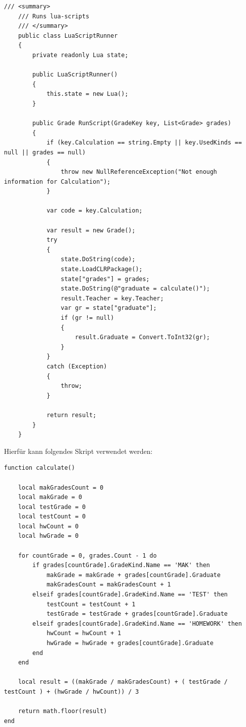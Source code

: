 \begin{lstlisting}[language={[Sharp]C},caption=Code for NLua,label=lst:impl:nlua]
    /// <summary>
    /// Runs lua-scripts
    /// </summary>
    public class LuaScriptRunner
    {
        private readonly Lua state;

        public LuaScriptRunner()
        {
            this.state = new Lua();
        }

        public Grade RunScript(GradeKey key, List<Grade> grades)
        {
            if (key.Calculation == string.Empty || key.UsedKinds == null || grades == null)
            {
                throw new NullReferenceException("Not enough information for Calculation");
            }

            var code = key.Calculation;

            var result = new Grade();
            try
            {
                state.DoString(code);
                state.LoadCLRPackage();
                state["grades"] = grades;
                state.DoString(@"graduate = calculate()");
                result.Teacher = key.Teacher;
                var gr = state["graduate"];
                if (gr != null) 
                {
                    result.Graduate = Convert.ToInt32(gr);
                }
            }
            catch (Exception)
            {
                throw;
            }

            return result;
        }
    }
\end{lstlisting}
\newpage
Hierfür kann folgendes Skript verwendet werden:
\begin{lstlisting}[language={[5.0]Lua},caption=Lua Example,label=lst:impl:luascript]
function calculate()

    local makGradesCount = 0
    local makGrade = 0
    local testGrade = 0
    local testCount = 0
    local hwCount = 0
    local hwGrade = 0

    for countGrade = 0, grades.Count - 1 do 
        if grades[countGrade].GradeKind.Name == 'MAK' then
            makGrade = makGrade + grades[countGrade].Graduate
            makGradesCount = makGradesCount + 1
        elseif grades[countGrade].GradeKind.Name == 'TEST' then
            testCount = testCount + 1
            testGrade = testGrade + grades[countGrade].Graduate
        elseif grades[countGrade].GradeKind.Name == 'HOMEWORK' then
            hwCount = hwCount + 1
            hwGrade = hwGrade + grades[countGrade].Graduate
        end
    end

    local result = ((makGrade / makGradesCount) + ( testGrade / testCount ) + (hwGrade / hwCount)) / 3     

    return math.floor(result)
end
\end{lstlisting}
\newpage

